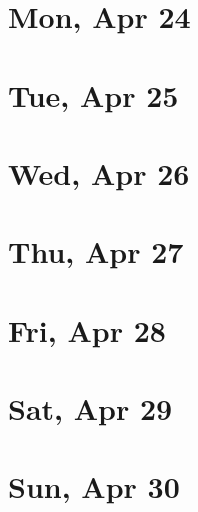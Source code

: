 	\section{Mon, Apr 24}
		
	\section{Tue, Apr 25}
		
	\section{Wed, Apr 26}
		
	\section{Thu, Apr 27}
		
	\section{Fri, Apr 28}
		
	\section{Sat, Apr 29}
		
	\section{Sun, Apr 30}
		
